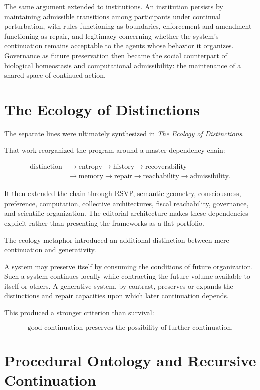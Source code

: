 \documentclass[11pt,oneside]{book}
\numberwithin{equation}{chapter}
\theoremstyle{definition}
\theoremstyle{plain}
\begin{document}
The same argument extended to institutions. An institution persists by maintaining admissible transitions among participants under continual perturbation, with rules functioning as boundaries, enforcement and amendment functioning as repair, and legitimacy concerning whether the system's continuation remains acceptable to the agents whose behavior it organizes. Governance as future preservation then became the social counterpart of biological homeostasis and computational admissibility: the maintenance of a shared space of continued action.

\section{The Ecology of Distinctions}

The separate lines were ultimately synthesized in \emph{The Ecology of
Distinctions}.

That work reorganized the program around a master dependency chain:

\[
\begin{aligned}
\text{distinction}
&\rightarrow
\text{entropy}
\rightarrow
\text{history}
\rightarrow
\text{recoverability}
\\
&\rightarrow
\text{memory}
\rightarrow
\text{repair}
\rightarrow
\text{reachability}
\rightarrow
\text{admissibility}.
\end{aligned}
\]

It then extended the chain through RSVP, semantic geometry, consciousness,
preference, computation, collective architectures, fiscal reachability,
governance, and scientific organization. The editorial architecture makes
these dependencies explicit rather than presenting the frameworks as a flat
portfolio.

The ecology metaphor introduced an additional distinction between mere
continuation and generativity.

A system may preserve itself by consuming the conditions of future
organization. Such a system continues locally while contracting the future
volume available to itself or others. A generative system, by contrast,
preserves or expands the distinctions and repair capacities upon which
later continuation depends.

This produced a stronger criterion than survival:

\[
\text{good continuation preserves the possibility of further continuation}.
\]

\section{Procedural Ontology and Recursive Continuation}
\end{document}
